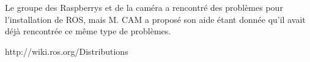 \documentclass{PackagerQualityN}
\begin{document}
Le groupe des Raspberrys et de la caméra a rencontré des problèmes pour l'installation de ROS, mais M. CAM a proposé son aide étant donnée qu'il avait déjà rencontrée ce même type de problèmes.









\newp       %

\listoffigures

\newp



\citep{lienLogicielCamera} 
\citep{lienRoue} 
\citep{buck} 
\citep{lienLogicielCamera} 
http://wiki.ros.org/Distributions
\end{document}
